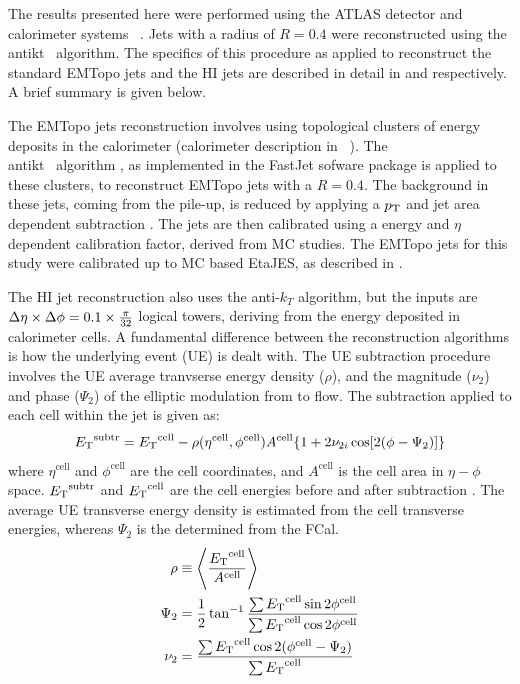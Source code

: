 The results presented here were performed using the ATLAS detector and calorimeter systems ~\cite{Aad:2008zzm}. Jets with a radius of $R=0.4$ were reconstructed using the \\antikt \ algorithm.  The specifics of this procedure as applied to reconstruct the standard EMTopo jets and the HI jets are described in detail in \cite{Aad:2011he} and \cite{Aad:hi_jets} respectively. A brief summary is given below.

The EMTopo jets reconstruction involves using topological clusters of energy deposits in the calorimeter (calorimeter description in ~\cite{Aad:2008zzm}). The \\antikt \ algorithm \cite{antikt_algo}, as implemented in the FastJet sofware package \cite{fastjet_algo} is applied to these clusters, to reconstruct EMTopo jets with a $R = 0.4$.  The background in these jets, coming from the pile-up, is reduced by applying a $\mbox{$p_{\mathrm{T}}$}$ and jet area dependent subtraction \cite{pp_pileup_subtr}. The jets are then calibrated using a energy and $\eta$ dependent calibration factor, derived from MC studies. The EMTopo jets for this study were calibrated up to MC based EtaJES, as described in \cite{CalibReco}.

The HI jet reconstruction also uses the anti-$k_{T}$ algorithm, but the inputs are $\mbox{$\Delta \eta$} \times \mbox{$\Delta \phi$} = 0.1 \times \frac{\pi}{32}$ logical towers, deriving from the energy deposited in calorimeter cells. A fundamental difference between the reconstruction algorithms is how the underlying event (UE) is dealt with. The UE subtraction procedure involves the UE average tranvserse energy density ($\rho$), and the magnitude ($\nu_{2}$) and phase ($\Psi_{2}$) of the elliptic modulation from to flow. The subtraction applied to each cell within the jet is given as: 
\begin{align}
\mbox{$E_{\mathrm{T}}$}^{\mathrm{subtr}} = \mbox{$E_{\mathrm{T}}$}^{\mathrm{cell}} - \rho(\eta^{\mathrm{cell}},\phi^{\mathrm{cell}})A^{\mathrm{cell}} \{1 + 2\nu_{2 i}\cos[2(\phi - \Psi_2)]\}
\end{align}
where $\eta^{\mathrm{cell}}$ and $\phi^{\mathrm{cell}}$ are the cell coordinates, and $A^{\mathrm{cell}}$ is the cell area in $\eta-\phi$ space. $\mbox{$E_{\mathrm{T}}$}^{\mathrm{subtr}}$ and $ \mbox{$E_{\mathrm{T}}$}^{\mathrm{cell}}$ are the cell energies before and after subtraction \cite{HIjesnote}. The average UE transverse energy density is estimated from the cell transverse energies, whereas $\Psi_2$ is the determined from the FCal.
\begin{align}
\rho &\equiv \left\langle \frac{\mbox{$E_{\mathrm{T}}$}^{\mathrm{cell}}}{A^{\mathrm{cell}}}\right\rangle \\
\Psi_2 &= \frac{1}{2} \tan^{-1}\frac{\sum \mbox{$E_{\mathrm{T}}$}^{\mathrm{cell}} \sin 2\phi^{\mathrm{cell}} }{\sum \mbox{$E_{\mathrm{T}}$}^{\mathrm{cell}} \cos 2\phi^{\mathrm{cell}} } \\
\nu_2 &= \frac{\sum \mbox{$E_{\mathrm{T}}$}^{\mathrm{cell}} \cos 2(\phi^{\mathrm{cell}} - \Psi_2) }{\sum \mbox{$E_{\mathrm{T}}$}^{\mathrm{cell}}}
\end{align}

